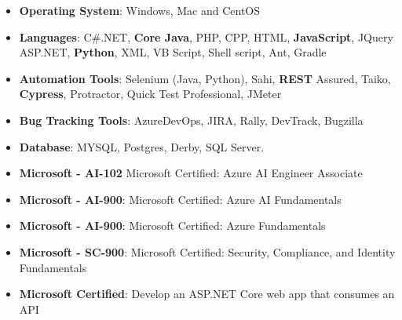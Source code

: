 \begin{cvparagraph}
\begin{itemize}
\item {\textbf{Operating System}: Windows, Mac and CentOS}
\item {\textbf{Languages}: C\#.NET, \textbf{Core Java}, PHP, CPP, HTML, \textbf{JavaScript}, JQuery ASP.NET, \textbf{Python}, XML, VB Script, Shell script, Ant, Gradle}
\item {\textbf{Automation  Tools}: Selenium (Java, Python), Sahi, \textbf{REST} Assured, Taiko, \textbf{Cypress}, Protractor, Quick Test Professional, JMeter}
\item {\textbf{Bug Tracking Tools}: AzureDevOps, JIRA, Rally, DevTrack, Bugzilla }
\item {\textbf{Database}: MYSQL, Postgres, Derby, SQL Server.}
\end{itemize}
\begin{itemize}
    \item {\textbf{Microsoft - AI-102} Microsoft Certified: Azure AI Engineer Associate}
    \item {\textbf{Microsoft - AI-900}: Microsoft Certified: Azure AI Fundamentals }
    \item {\textbf{{Microsoft - AI-900}}: Microsoft Certified: Azure Fundamentals}
    \item {\textbf{Microsoft - SC-900}: Microsoft Certified: Security, Compliance, and Identity Fundamentals}
    \item {\textbf{Microsoft Certified}: Develop an ASP.NET Core web app that consumes an API}
\end{itemize}
\end{cvparagraph}
